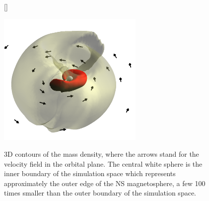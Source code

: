 \documentclass[letterpaper,12pt,onecolumn]{article}
\makeatletter
\newcommand*{\ns}{NS\@\xspace}
\makeatother
\begin{document}


\begin{figure}[!h]
\vspace*{-0.3cm}
[\FBwidth]
{\caption{3D contours of the mass density, where the arrows stand for the velocity field in the orbital plane. The central white sphere is the inner boundary of the simulation space which represents approximately the outer edge of the \ns magnetosphere, a few 100 times smaller than the outer boundary of the simulation space.}\label{fig:disc}}
{\includegraphics[width=7cm]{Figures/disc.png}}
\vspace*{-0.4cm}
\end{figure}
\end{document}
